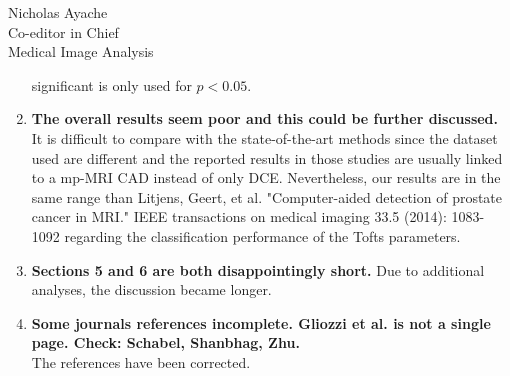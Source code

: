 \documentclass{letter}
\begin{document}
\begin{letter}{Nicholas Ayache \\ Co-editor in Chief \\ Medical Image Analysis}
\begin{enumerate}
    significant is only used for $p<0.05$.
  \item \textbf{The overall results seem poor and this could be
      further discussed.}\\
    It is difficult to compare with the state-of-the-art methods since
    the dataset used are different and the reported results in those
    studies are usually linked to a mp-MRI CAD instead of only
    DCE. Nevertheless, our results are in the same range than Litjens,
    Geert, et al. "Computer-aided detection of prostate cancer in
    MRI." IEEE transactions on medical imaging 33.5 (2014):
    1083-1092 regarding the classification performance of the Tofts
    parameters.
  \item \textbf{Sections 5 and 6 are both disappointingly short.}
    Due to additional analyses, the discussion became longer.
  \item \textbf{Some journals references incomplete. Gliozzi et al. is
      not a single page. Check: Schabel, Shanbhag, Zhu.}\\
    The references have been corrected.
  \end{enumerate}


\end{letter}
\end{document}
